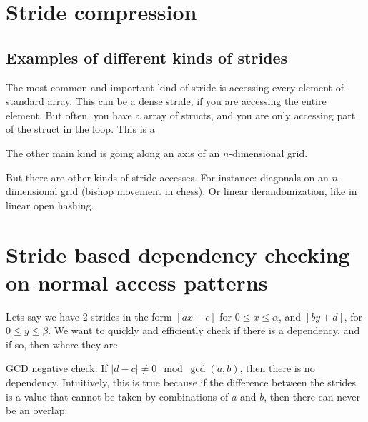 \documentclass[12pt,twoside]{reedthesis}
\begin{document}
		
		
		
		
	\section{Stride compression}
		
		\subsection{Examples of different kinds of strides}
		The most common and important kind of stride is accessing every element of standard array. This can be a dense stride, if you are accessing the entire element. But often, you have a array of structs, and you are only accessing part of the struct in the loop. This is a $ $
		
		The other main kind is going along an axis of an $n$-dimensional grid. 
		
		But there are other kinds of stride accesses. For instance: diagonals on an $n$-dimensional grid (bishop movement in chess). Or linear derandomization, like in linear open hashing. 
		
	\section{Stride based dependency checking on normal access patterns}
		
		Lets say we have 2 strides in the form $[ax+c]$ for $0\le x \le \alpha$, and $[by+d]$, for $0 \le y \le \beta$. We want to quickly and efficiently check if there is a dependency, and if so, then where they are. 
		
		GCD negative check: If $|d-c| \ne 0 \mod \gcd(a,b)$, then there is no dependency. Intuitively, this is true because if the difference between the strides is a value that cannot be taken by combinations of $a$ and $b$, then there can never be an overlap. 
		
\end{document}
